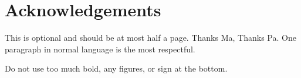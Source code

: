 \chapter*{Acknowledgements}

This is optional and should be at most half a page.
Thanks Ma, Thanks Pa. One paragraph in normal language is the most respectful.  

Do not use too much bold, any figures, or sign at the bottom. 